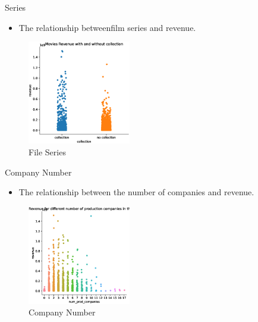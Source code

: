 \documentclass[
 size=14pt,
 paper=smartboard,  %
 mode=present, 		%
 display=slides, 	%
 style=tuliplab,  	%
 pauseslide,
 fleqn,leqno]{powerdot}
\begin{document}
\begin{slide}[toc=,bm=]{Series}
  \begin{itemize}
    \item The relationship betweenfilm series and revenue.
  \end{itemize}
  \begin{figure}[htbp]
    \centering
    \includegraphics[width=0.4\textwidth]{figures//collection.eps}
    \caption{File Series}
  \end{figure}
\end{slide}


\begin{slide}{Company Number}
  \begin{itemize}
    \item The relationship between the number of companies and revenue.
  \end{itemize}
  \begin{figure}[htbp]
    \centering
    \includegraphics[width=0.4\textwidth]{figures//company.eps}
    \caption{Company Number}
  \end{figure}
\end{slide}
\end{document}
